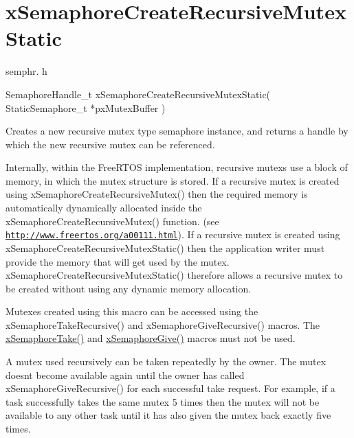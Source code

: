 \hypertarget{group__x_semaphore_create_recursive_mutex_static}{}\section{x\+Semaphore\+Create\+Recursive\+Mutex\+Static}
\label{group__x_semaphore_create_recursive_mutex_static}
semphr. h 
\begin{DoxyPre}SemaphoreHandle\_t xSemaphoreCreateRecursiveMutexStatic( StaticSemaphore\_t *pxMutexBuffer )\end{DoxyPre}


Creates a new recursive mutex type semaphore instance, and returns a handle by which the new recursive mutex can be referenced.

Internally, within the Free\+R\+T\+OS implementation, recursive mutexs use a block of memory, in which the mutex structure is stored. If a recursive mutex is created using x\+Semaphore\+Create\+Recursive\+Mutex() then the required memory is automatically dynamically allocated inside the x\+Semaphore\+Create\+Recursive\+Mutex() function. (see \href{http://www.freertos.org/a00111.html}{\tt http\+://www.\+freertos.\+org/a00111.\+html}). If a recursive mutex is created using x\+Semaphore\+Create\+Recursive\+Mutex\+Static() then the application writer must provide the memory that will get used by the mutex. x\+Semaphore\+Create\+Recursive\+Mutex\+Static() therefore allows a recursive mutex to be created without using any dynamic memory allocation.

Mutexes created using this macro can be accessed using the x\+Semaphore\+Take\+Recursive() and x\+Semaphore\+Give\+Recursive() macros. The \hyperlink{semphr_8h_af116e436d2a5ae5bd72dbade2b5ea930}{x\+Semaphore\+Take()} and \hyperlink{semphr_8h_aae55761cabfa9bf85c8f4430f78c0953}{x\+Semaphore\+Give()} macros must not be used.

A mutex used recursively can be \textquotesingle{}taken\textquotesingle{} repeatedly by the owner. The mutex doesn\textquotesingle{}t become available again until the owner has called x\+Semaphore\+Give\+Recursive() for each successful \textquotesingle{}take\textquotesingle{} request. For example, if a task successfully \textquotesingle{}takes\textquotesingle{} the same mutex 5 times then the mutex will not be available to any other task until it has also \textquotesingle{}given\textquotesingle{} the mutex back exactly five times.

